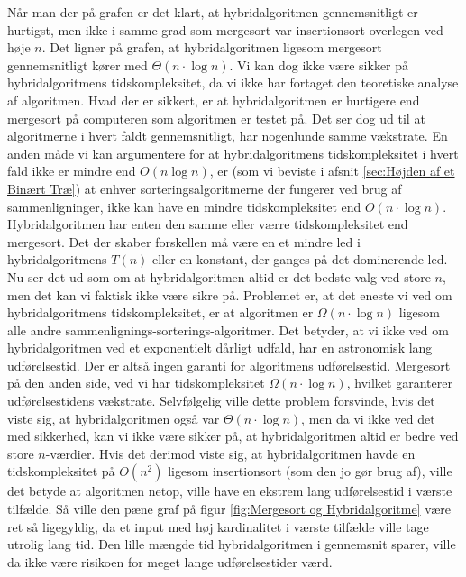 Når man der på grafen er det klart, at hybridalgoritmen gennemsnitligt er hurtigst, men ikke i samme grad som mergesort var insertionsort overlegen ved høje $n$. Det ligner på grafen, at hybridalgoritmen ligesom mergesort gennemsnitligt kører med $\Theta (n \cdot \log n)$. Vi kan dog ikke være sikker på hybridalgoritmens tidskompleksitet, da vi ikke har fortaget den teoretiske analyse af algoritmen. Hvad der er sikkert, er at hybridalgoritmen er hurtigere end mergesort på computeren som algoritmen er testet på. Det ser dog ud til at algoritmerne i hvert faldt gennemsnitligt, har nogenlunde samme vækstrate. En anden måde vi kan argumentere for at hybridalgoritmens tidskompleksitet i hvert fald ikke er mindre end $O(n \log n)$, er (som vi beviste i afsnit \ref{sec:Højden af et Binært Træ}) at enhver sorteringsalgoritmerne der fungerer ved brug af sammenligninger, ikke kan have en mindre tidskompleksitet end $O(n \cdot \log n)$. Hybridalgoritmen har enten den samme eller værre tidskompleksitet end mergesort. Det der skaber forskellen må være en et mindre led i hybridalgoritmens $T(n)$ eller en konstant, der ganges på det dominerende led.\\

Nu ser det ud som om at hybridalgoritmen altid er det bedste valg ved store $n$, men det kan vi faktisk ikke være sikre på. Problemet er, at det eneste vi ved om hybridalgoritmens tidskompleksitet, er at algoritmen er $\Omega (n \cdot \log n)$ ligesom alle andre sammenlignings-sorterings-algoritmer. Det betyder, at vi ikke ved om hybridalgoritmen ved et exponentielt dårligt udfald, har en astronomisk lang udførelsestid. Der er altså ingen garanti for algoritmens udførelsestid. Mergesort på den anden side, ved vi har tidskompleksitet $\Omega (n \cdot \log n)$, hvilket garanterer udførelsestidens vækstrate. Selvfølgelig ville dette problem forsvinde, hvis det viste sig, at hybridalgoritmen også var $\Theta (n \cdot \log n)$, men da vi ikke ved det med sikkerhed, kan vi ikke være sikker på, at hybridalgoritmen altid er bedre ved store $n$-værdier. Hvis det derimod viste sig, at hybridalgoritmen havde en tidskompleksitet på $O(n^2)$ ligesom insertionsort (som den jo gør brug af), ville det betyde at algoritmen netop, ville have en ekstrem lang udførelsestid i værste tilfælde. Så ville den pæne graf på figur \ref{fig:Mergesort og Hybridalgoritme} være ret så ligegyldig, da et input med høj kardinalitet i værste tilfælde ville tage utrolig lang tid. Den lille mængde tid hybridalgoritmen i gennemsnit sparer, ville da ikke være risikoen for meget lange udførelsestider værd.


